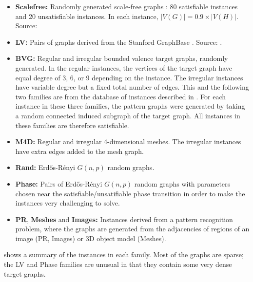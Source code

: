 \begin{itemize}
    \item
        \textbf{Scalefree:} Randomly generated scale-free graphs \citep{DBLP:books/daglib/0012457}: 80
        satisfiable instances and 20 unsatisfiable instances.  In each instance,
        $|V(G)| = 0.9 \times |V(H)|$. Source: \citet{DBLP:journals/constraints/ZampelliDS10}
    \item
        \textbf{LV:} Pairs of graphs derived from the Stanford GraphBase \citep{DBLP:books/daglib/0071477}.
        Source: \cite{DBLP:journals/mscs/LarrosaV02}.
    \item \textbf{BVG:} Regular and irregular bounded valence target graphs, randomly generated.
        In the regular instances, the vertices of the target graph have equal degree of 3, 6, or 9
        depending on the instance.  The irregular instances have variable degree but a fixed total
        number of edges.
        This and the following two families are from the database
        of instances described in \citet{DBLP:journals/prl/SantoFSV03}.  For each instance in these
        three families, the pattern graphs were generated by taking a random connected
        induced subgraph of the target graph. All instances in these families are therefore satisfiable.
    \item \textbf{M4D:} Regular and irregular 4-dimensional meshes.  The irregular instances have
        extra edges added to the mesh graph.
    \item \textbf{Rand:} Erd\H{o}s-Rényi $G(n,p)$ random graphs.
    \item \textbf{Phase:} Pairs of Erd\H{o}s-Rényi $G(n,p)$ random graphs
        with parameters chosen near the satisfiable/unsatifiable phase transition in order
        to make the instances very challenging to solve.
        \citep{DBLP:journals/jair/McCreeshPST18}
    \item \textbf{PR}, \textbf{Meshes} and \textbf{Images:} Instances derived from a pattern recognition problem, where
    	the graphs are generated from the adjacencies of regions of an image (PR, Images)
	or 3D object model (Meshes). \citep{DBLP:journals/pr/SolnonDHJ15,DBLP:journals/cviu/DamiandSHJS11}
\end{itemize}

 shows a summary of the instances in each family.
Most of the graphs are sparse; the LV and Phase families are unusual in that they contain
some very dense target graphs.

